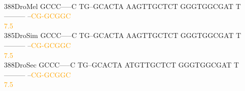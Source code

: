 \documentclass[11pt,twoside,reqno,a4paper]{article}
\begin{document}
{\\
388\hspace*{1\charwidth}DroMel	GCCC-----C	TG--GCACTA	AAGTTGCTCT	GGGTGGCGAT	T---------	--\textcolor{orange}{C}\textcolor{orange}{G}\textcolor{orange}{-}\textcolor{orange}{G}\textcolor{orange}{C}\textcolor{orange}{G}\textcolor{orange}{G}\textcolor{orange}{C}	\\
\hspace*{4\charwidth}\hspace*{7\charwidth}\hspace*{1\charwidth}\hspace*{1\charwidth}\hspace*{1\charwidth}\hspace*{1\charwidth}\hspace*{1\charwidth}\hspace*{52\charwidth}\textcolor{orange}{7.5}\hspace*{1\charwidth}\\
385\hspace*{1\charwidth}DroSim	GCCC-----C	TG--GCACTA	AAGTTGCTCT	GGGTGGCGAT	T---------	--\textcolor{orange}{C}\textcolor{orange}{G}\textcolor{orange}{-}\textcolor{orange}{G}\textcolor{orange}{C}\textcolor{orange}{G}\textcolor{orange}{G}\textcolor{orange}{C}	\\
\hspace*{4\charwidth}\hspace*{7\charwidth}\hspace*{1\charwidth}\hspace*{1\charwidth}\hspace*{1\charwidth}\hspace*{1\charwidth}\hspace*{1\charwidth}\hspace*{52\charwidth}\textcolor{orange}{7.5}\hspace*{1\charwidth}\\
388\hspace*{1\charwidth}DroSec	GCCC-----C	TG--GCACTA	ATGTTGCTCT	GGGTGGCGAT	T---------	--\textcolor{orange}{C}\textcolor{orange}{G}\textcolor{orange}{-}\textcolor{orange}{G}\textcolor{orange}{C}\textcolor{orange}{G}\textcolor{orange}{G}\textcolor{orange}{C}	\\
\hspace*{4\charwidth}\hspace*{7\charwidth}\hspace*{1\charwidth}\hspace*{1\charwidth}\hspace*{1\charwidth}\hspace*{1\charwidth}\hspace*{1\charwidth}\hspace*{52\charwidth}\textcolor{orange}{7.5}\hspace*{1\charwidth}\\
}
\end{document}

